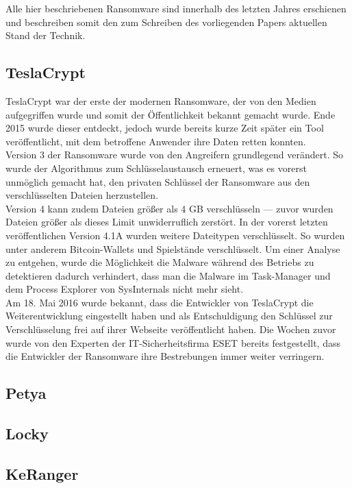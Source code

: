 Alle hier beschriebenen Ransomware sind innerhalb des letzten Jahres erschienen und beschreiben somit den zum Schreiben des vorliegenden Papers aktuellen Stand der Technik.

\subsection{TeslaCrypt}
TeslaCrypt war der erste der modernen Ransomware, der von den Medien aufgegriffen wurde und somit der Öffentlichkeit bekannt gemacht wurde. Ende 2015\cite{tesla:entdeckt} wurde dieser entdeckt, jedoch wurde bereits kurze Zeit später ein Tool veröffentlicht\cite{tesla:geknackt}, mit dem betroffene Anwender ihre Daten retten konnten.\\
Version 3 der Ransomware wurde von den Angreifern grundlegend verändert. So wurde der Algorithmus zum Schlüsselaustausch erneuert, was es vorerst unmöglich gemacht hat, den privaten Schlüssel der Ransomware aus den verschlüsselten Dateien herzustellen\cite{tesla:version3}\cite{tesla:version3_2}.\\
Version 4 kann zudem Dateien größer als 4 GB verschlüsseln\cite{tesla:version4} --- zuvor wurden Dateien größer als dieses Limit unwiderruflich zerstört. In der vorerst letzten veröffentlichen Version 4.1A\cite{tesla:version41} wurden weitere Dateitypen verschlüsselt. So wurden unter anderem Bitcoin-Wallets und Spielstände verschlüsselt. Um einer Analyse zu entgehen, wurde die Möglichkeit die Malware während des Betriebs zu detektieren dadurch verhindert, dass man die Malware im Task-Manager und dem Process Explorer von SysInternals nicht mehr sieht.\\
Am 18. Mai 2016 wurde bekannt\cite{tesla:end}, dass die Entwickler von TeslaCrypt die Weiterentwicklung eingestellt haben und als Entschuldigung den Schlüssel zur Verschlüsselung frei auf ihrer Webseite veröffentlicht haben. Die Wochen zuvor wurde von den Experten der IT-Sicherheitsfirma ESET bereits festgestellt, dass die Entwickler der Ransomware ihre Bestrebungen immer weiter verringern.

		
\subsection{Petya}
\subsection{Locky}
\subsection{KeRanger}